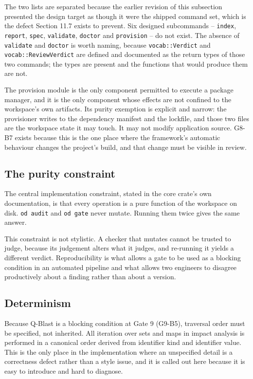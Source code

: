 \documentclass[11pt,a4paper]{article}
\begin{document}
The two lists are separated because the earlier revision of this subsection presented the design target as though it were the shipped command set, which is the defect Section 11.7 exists to prevent. Six designed subcommands -- \texttt{index}, \texttt{report}, \texttt{spec}, \texttt{validate}, \texttt{doctor} and \texttt{provision} -- do not exist. The absence of \texttt{validate} and \texttt{doctor} is worth naming, because \texttt{vocab::Verdict} and \texttt{vocab::ReviewVerdict} are defined and documented as the return types of those two commands; the types are present and the functions that would produce them are not.

The provision module is the only component permitted to execute a package manager, and it is the only component whose effects are not confined to the workspace's own artifacts. Its purity exemption is explicit and narrow: the provisioner writes to the dependency manifest and the lockfile, and those two files are the workspace state it may touch. It may not modify application source. G8-B7 exists because this is the one place where the framework's automatic behaviour changes the project's build, and that change must be visible in review.

\subsection{The purity constraint}

The central implementation constraint, stated in the core crate's own documentation, is that every operation is a pure function of the workspace on disk. \texttt{od audit} and \texttt{od gate} never mutate. Running them twice gives the same answer.

This constraint is not stylistic. A checker that mutates cannot be trusted to judge, because its judgement alters what it judges, and re-running it yields a different verdict. Reproducibility is what allows a gate to be used as a blocking condition in an automated pipeline and what allows two engineers to disagree productively about a finding rather than about a version.

\subsection{Determinism}

Because Q-Blast is a blocking condition at Gate 9 (G9-B5), traversal order must be specified, not inherited. All iteration over sets and maps in impact analysis is performed in a canonical order derived from identifier kind and identifier value. This is the only place in the implementation where an unspecified detail is a correctness defect rather than a style issue, and it is called out here because it is easy to introduce and hard to diagnose.
\end{document}
